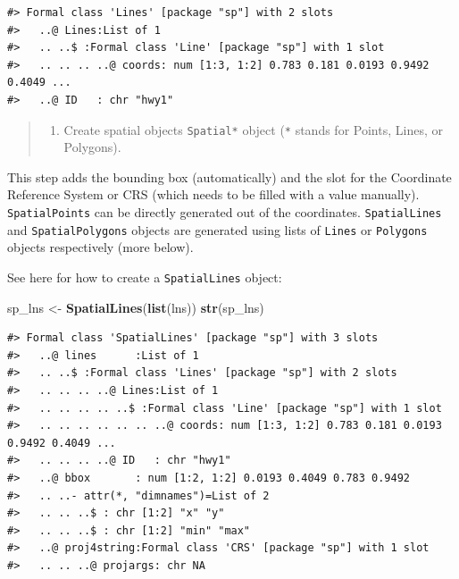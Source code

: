 \documentclass[]{book}
\newenvironment{Shaded}{\begin{snugshade}}{\end{snugshade}}
\newcommand{\KeywordTok}[1]{\textcolor[rgb]{0.13,0.29,0.53}{\textbf{#1}}}
\newcommand{\StringTok}[1]{\textcolor[rgb]{0.31,0.60,0.02}{#1}}
\newcommand{\NormalTok}[1]{#1}
\providecommand{\tightlist}{%
  \setlength{\itemsep}{0pt}\setlength{\parskip}{0pt}}
\theoremstyle{definition}
\theoremstyle{definition}
\theoremstyle{definition}
\theoremstyle{remark}
\begin{document}
\begin{verbatim}
#> Formal class 'Lines' [package "sp"] with 2 slots
#>   ..@ Lines:List of 1
#>   .. ..$ :Formal class 'Line' [package "sp"] with 1 slot
#>   .. .. .. ..@ coords: num [1:3, 1:2] 0.783 0.181 0.0193 0.9492 0.4049 ...
#>   ..@ ID   : chr "hwy1"
\end{verbatim}

\begin{quote}
\begin{enumerate}
\def\labelenumi{\Roman{enumi}.}
\setcounter{enumi}{1}
\tightlist
\item
  Create spatial objects \texttt{Spatial*} object (\texttt{*} stands for
  Points, Lines, or Polygons).
\end{enumerate}
\end{quote}

This step adds the bounding box (automatically) and the slot for the
Coordinate Reference System or CRS (which needs to be filled with a
value manually). \texttt{SpatialPoints} can be directly generated out of
the coordinates. \texttt{SpatialLines} and \texttt{SpatialPolygons}
objects are generated using lists of \texttt{Lines} or \texttt{Polygons}
objects respectively (more below).

See here for how to create a \texttt{SpatialLines} object:

\begin{Shaded}
\begin{Highlighting}[]
\NormalTok{sp_lns <-}\StringTok{ }\KeywordTok{SpatialLines}\NormalTok{(}\KeywordTok{list}\NormalTok{(lns))}
\KeywordTok{str}\NormalTok{(sp_lns)}
\end{Highlighting}
\end{Shaded}

\begin{verbatim}
#> Formal class 'SpatialLines' [package "sp"] with 3 slots
#>   ..@ lines      :List of 1
#>   .. ..$ :Formal class 'Lines' [package "sp"] with 2 slots
#>   .. .. .. ..@ Lines:List of 1
#>   .. .. .. .. ..$ :Formal class 'Line' [package "sp"] with 1 slot
#>   .. .. .. .. .. .. ..@ coords: num [1:3, 1:2] 0.783 0.181 0.0193 0.9492 0.4049 ...
#>   .. .. .. ..@ ID   : chr "hwy1"
#>   ..@ bbox       : num [1:2, 1:2] 0.0193 0.4049 0.783 0.9492
#>   .. ..- attr(*, "dimnames")=List of 2
#>   .. .. ..$ : chr [1:2] "x" "y"
#>   .. .. ..$ : chr [1:2] "min" "max"
#>   ..@ proj4string:Formal class 'CRS' [package "sp"] with 1 slot
#>   .. .. ..@ projargs: chr NA
\end{verbatim}
\end{document}
